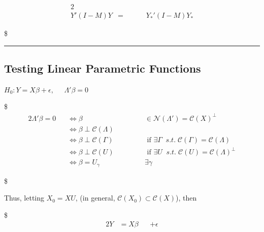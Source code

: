 \documentclass[
]{book}
\begin{document}
{{{\begin{alignat}{2}
\\

Y ' (I-M)Y &= && && Y_\ast ' (I-M)Y_\ast  




\end{alignat}

\$

\begin{center}\rule{0.5\linewidth}{0.5pt}\end{center}

\hypertarget{testing-linear-parametric-functions}{%
\subsection{Testing Linear Parametric Functions}\label{testing-linear-parametric-functions}}

\(H_0: Y= X \beta + \epsilon, \; \; \; \; \; \Lambda' \beta=0 \tag{1}\)

\$
\begin{alignat}{2}


\Lambda ' \beta = 0 \; \; \; &\iff \beta &&\in \mathcal{N}(\Lambda ') = \mathcal{C}(X)^\perp

\\

&\iff \beta \perp \mathcal{C}(\Lambda)



\\

&\iff \beta \perp \mathcal{C}(\Gamma) \; \; \; \; \; \; \; \; \; \; &&\text{ if } \exists\Gamma \; \; s.t. \; \mathcal{C}(\Gamma) = \mathcal{C}(\Lambda)

\\

&\iff \beta \perp \mathcal{C}(U) &&\text{ if } \exists U \; \; s.t. \; \mathcal{C}(U) = \mathcal{C}(\Lambda)^\perp

\\

&\iff \beta = U_\gamma && \exists \gamma \tag{2}



\end{alignat}

\$

Thus, letting \(X_0 = XU\), (in general, \(\mathcal{C}(X_0) \subset \mathcal{C}(X)\)), then

\$
\begin{alignat}{2}



Y &= X \beta &&+ \epsilon


\end{alignat}}}}
\end{document}
